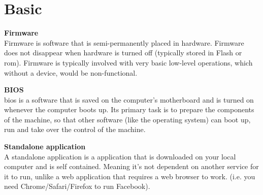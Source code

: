 \section{Basic}
\textbf{Firmware \\}
Firmware is software that is semi-permanently placed in hardware. Firmware does not disappear when 
hardware is turned off (typically stored in Flash or \acrshort{rom}). 
Firmware is typically involved with very basic low-level operations, which without a device, would be
non-functional.  

\textbf{BIOS} \\
\acrfull{bios} is a software that is saved on the computer's motherboard
and is turned on whenever the computer boots up. Its primary task is to prepare the components of the machine, so that other software (like the operating system) can boot up, run and take over the control of the machine.  

\textbf{Standalone application} \\
A standalone application is a application that is downloaded on your local computer and is self contained. Meaning it's not dependent on another service for it to run, unlike a web application that requires a web browser to work. (i.e. you need Chrome/Safari/Firefox to run Facebook). 

\newpage
    

